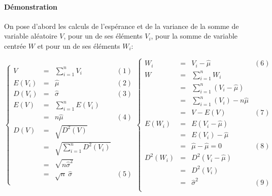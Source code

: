 \paragraph{Démonstration}
On pose d'abord les calculs de l'espérance et de la variance de la somme de variable aléatoire $V$, pour un de ses éléments $V_i$, pour la somme de variable centrée $W$ et pour un de ses éléments $W_i$:
\begin{center}
$\left\{\begin{array}{LCLC}
V        &=& \sum_{i=1}^n V_i&(1)\\
E( V_i ) &=& \widehat{\mu}&(2)\\
D( V_i ) &=& \widehat{\sigma}&(3)\\
E( V )   &=& \sum_{i=1}^n E (V_i)\\
         &=& n\widehat{\mu}&(4)\\
D( V )   &=& \sqrt{D^2(V)}\\
         &=& \sqrt{\sum_{i=1}^n D^2(V_i)}\\
         &=& \sqrt{n\widehat{\sigma}^2}\\
         &=& \sqrt{n}\ \widehat{\sigma}&(5)\\
\end{array}\right.
\left\{\begin{array}{LCLC}
W_i      &=& V_i - \widehat{\mu}&(6)\\
W        &=& \sum_{i=1}^n W_i\\
         &=& \sum_{i=1}^n  (V_i - \widehat{\mu})\\
         &=& \sum_{i=1}^n  (V_i) - n\widehat{\mu}\\
         &=& V - E ( V )&(7)\\
E(W_i)   &=& E ( V_i - \widehat{\mu} )\\
         &=& E( V_i ) - \widehat{\mu}\\
         &=& \widehat{\mu} - \widehat{\mu} = 0&(8)\\
D^2(W_i) &=& D^2( V_i - \widehat{\mu} )\\
         &=& D^2( V_i )\\
         &=& \widehat{\sigma}^2&(9)\\
\end{array}\right.$
\end{center}


